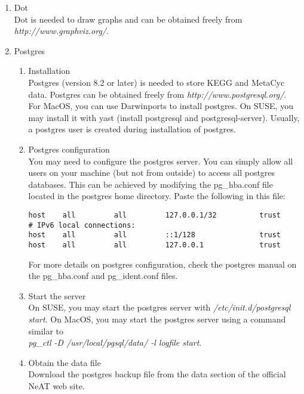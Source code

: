 \documentclass{book}
\begin{document}
\begin{enumerate}

\item Dot\\
Dot is needed to draw graphs and can be obtained freely from \textit{http://www.graphviz.org/}.

\item Postgres
\begin{enumerate}
\item Installation\\
Postgres (version 8.2 or later) is needed to store KEGG and MetaCyc data.
Postgres can be obtained freely from
\textit{http://www.postgresql.org/}.
For MacOS, you can use Darwinports to install postgres. On SUSE, you may
install it with yast (install postgresql and postgresql-server).
Usually, a postgres user is created during installation of postgres.

\item Postgres configuration\\
You may need to configure the postgres server. You can simply
allow all users on your machine (but not from outside) to access
all postgres databases.
This can be achieved by modifying the pg\_hba.conf file
located in the postgres home directory. Paste the following in this file:
\begin{footnotesize}
\begin{verbatim}
host    all         all         127.0.0.1/32          trust
# IPv6 local connections:
host    all         all         ::1/128               trust
host    all         all         127.0.0.1             trust
\end{verbatim}
\end{footnotesize}
For more details on postgres configuration, check the postgres manual
on the pg\_hba.conf and pg\_ident.conf files.

\item Start the server\\
On SUSE, you may start the postgres server with
\textit{/etc/init.d/postgresql start}. On MacOS, you may start the postgres server
using a command similar to\\
\textit{pg\_ctl -D /usr/local/pgsql/data/ -l logfile start}.\\

\item Obtain the data file\\
Download the postgres backup file 
from the data section of the official NeAT web site.


\end{enumerate}
\end{enumerate}
\end{document}
